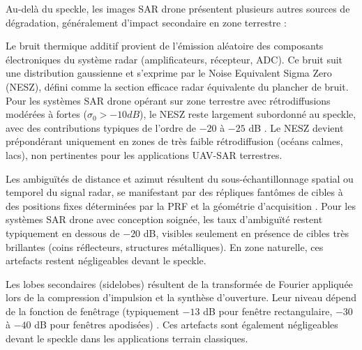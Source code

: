 Au-delà du speckle, les images SAR drone présentent plusieurs autres sources de dégradation, généralement d'impact secondaire en zone terrestre :


Le bruit thermique additif provient de l'émission aléatoire des composants électroniques du système radar (amplificateurs, récepteur, ADC). Ce bruit suit une distribution gaussienne et s'exprime par le Noise Equivalent Sigma Zero (NESZ), défini comme la section efficace radar équivalente du plancher de bruit. Pour les systèmes SAR drone opérant sur zone terrestre avec rétrodiffusions modérées à fortes ($\sigma_0 > -10 dB$), le NESZ reste largement subordonné au speckle, avec des contributions typiques de l'ordre de $-20$ à $-25$ dB \cite{curlander1991sar}. Le NESZ devient prépondérant uniquement en zones de très faible rétrodiffusion (océans calmes, lacs), non pertinentes pour les applications UAV-SAR terrestres.


Les ambiguïtés de distance et azimut résultent du sous-échantillonnage spatial ou temporel du signal radar, se manifestant par des répliques fantômes de cibles à des positions fixes déterminées par la PRF et la géométrie d'acquisition \cite{curlander1991sar}. Pour les systèmes SAR drone avec conception soignée, les taux d'ambiguïté restent typiquement en dessous de $-20$ dB, visibles seulement en présence de cibles très brillantes (coins réflecteurs, structures métalliques). En zone naturelle, ces artefacts restent négligeables devant le speckle.


Les lobes secondaires (sidelobes) résultent de la transformée de Fourier appliquée lors de la compression d'impulsion et la synthèse d'ouverture. Leur niveau dépend de la fonction de fenêtrage (typiquement $-13$ dB pour fenêtre rectangulaire, $-30$ à $-40$ dB pour fenêtres apodisées) \cite{cumming2005}. Ces artefacts sont également négligeables devant le speckle dans les applications terrain classiques.

